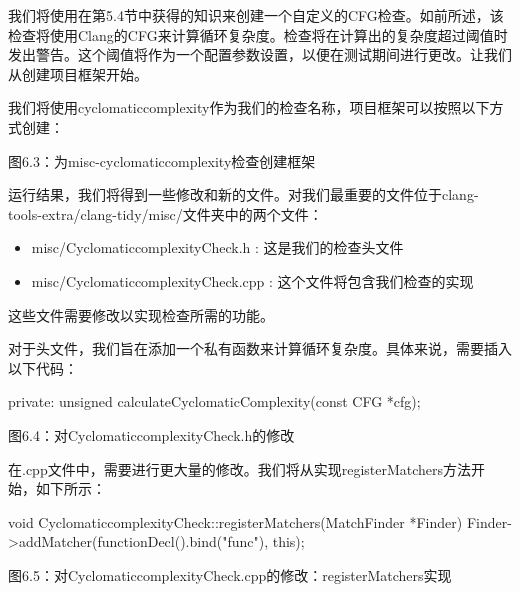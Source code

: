 我们将使用在第5.4节中获得的知识来创建一个自定义的CFG检查。如前所述，该检查将使用Clang的CFG来计算循环复杂度。检查将在计算出的复杂度超过阈值时发出警告。这个阈值将作为一个配置参数设置，以便在测试期间进行更改。让我们从创建项目框架开始。



我们将使用cyclomaticcomplexity作为我们的检查名称，项目框架可以按照以下方式创建：


\begin{center}
图6.3：为misc-cyclomaticcomplexity检查创建框架
\end{center}

运行结果，我们将得到一些修改和新的文件。对我们最重要的文件位于clang-tools-extra/clang-tidy/misc/文件夹中的两个文件：

\begin{itemize}
\item
misc/CyclomaticcomplexityCheck.h : 这是我们的检查头文件

\item
misc/CyclomaticcomplexityCheck.cpp : 这个文件将包含我们检查的实现
\end{itemize}

这些文件需要修改以实现检查所需的功能。


对于头文件，我们旨在添加一个私有函数来计算循环复杂度。具体来说，需要插入以下代码：

\begin{cpp}
private:
  unsigned calculateCyclomaticComplexity(const CFG *cfg);
\end{cpp}

\begin{center}
图6.4：对CyclomaticcomplexityCheck.h的修改
\end{center}

在.cpp文件中，需要进行更大量的修改。我们将从实现registerMatchers方法开始，如下所示：

\begin{cpp}
void CyclomaticcomplexityCheck::registerMatchers(MatchFinder *Finder) {
  Finder->addMatcher(functionDecl().bind("func"), this);
}
\end{cpp}

\begin{center}
图6.5：对CyclomaticcomplexityCheck.cpp的修改：registerMatchers实现
\end{center}

